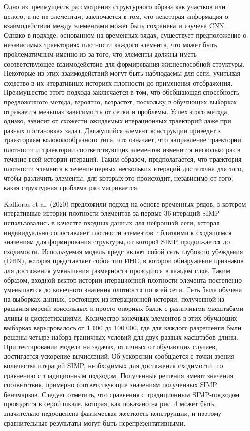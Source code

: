 Одно из преимуществ рассмотрения структурного образа как участков или целого, а не по элементам, заключается в том, что некоторая информация о взаимодействии между элементами может быть сохранена и изучена CNN. Однако в подходе, основанном на временных рядах, существует предположение о независимых траекториях плотности каждого элемента, что может быть проблематичным именно из-за того, что элементы должны иметь соответствующее взаимодействие для формирования жизнеспособной структуры. Некоторые из этих взаимодействий могут быть наблюдаемы для сети, учитывая сходство в их итеративных историях плотности до применения отображения. Преимущество этого подхода заключается в том, что обобщающая способность предложенного метода, вероятно, возрастет, поскольку в обучающих выборках отражается меньшая зависимость от сетки и проблемы. Успех этого метода, однако, зависит от схожести ожидаемых итерационных траекторий даже при разных постановках задач. Движущийся элемент конструкции приведет к траекториям колоколообразного типа, что означает, что направление траектории плотности и траектории соответствующих элементов изменится несколько раз в течение всей истории итераций. Таким образом, предполагается, что траектория плотности элемента в течение первых нескольких итераций достаточна для того, чтобы различить элементы, для которых это происходит, независимо от того, какая структурная проблема рассматривается.

Kallioras et al. (2020) предложили подход на основе временных рядов, в котором итеративные истории плотности элементов за первые 36 итераций SIMP использовались в качестве входных данных для нейронной сети, которая индивидуально сопоставляет плотности элементов с близкими к сходящимся значениям для формирования структуры, от которой SIMP продолжается до сходимости. Используемая модель представляет собой сеть глубокого убеждения (DBN), которая представляет собой тип ИНС, в которой обнаружение признаков для достижения уменьшения размерности проводится в каждом слое. Таким образом, входной вектор истории итерационной плотности элемента постепенно уменьшается до конечного значения плотности по всей сети. Сеть была обучена на выборках данных, состоящих из итерационной истории, полученной из решения версий консольных и просто опорных балок с различными масштабами длины и дискретизациями. Количество конечных элементов в этих обучающих выборках варьировалось от 1 000 до 100 000, где для каждого разрешения были решены четыре набора граничных условий для двух разных масштабов длины. При тестировании модели на задачах, отличных от обучающих случаев, достигается ускорение вычислений. Об ускорении сообщается с точки зрения количества итераций SIMP, необходимых для достижения сходимости, по сравнению с традиционным подходом. Полученные решения имеют значения соответствия, примерно соответствующие значениям полученных SIMP бенчмарков. Следует отметить, что сравнения с традиционным SIMP-подходом проводятся в серой шкале, которая, как показано на рис. 4 может быть значительно недооценена фактическая жесткость конструкции, и поэтому сравнительные результаты могут быть нерепрезентативными.

